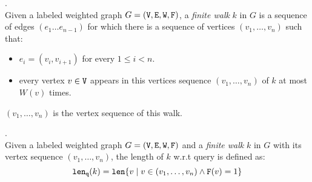 \documentclass[a4paper,11pt]{article}
\begin{document}
\begin{defn}.
\\
Given a labeled weighted graph $G = (\mathtt{V}, \mathtt{E}, \mathtt{W}, \mathtt{F})$, a \emph{finite walk} $k$ in $G$ is a sequence of edges $(e_1 \ldots e_{n - 1})$ 
for which there is a sequence of vertices $(v_1, \ldots, v_{n})$ such that:
\begin{itemize}
    \item $e_i = (v_{i},v_{i + 1})$ for every $1 \leq i < n$.
    \item every vertex $v \in \mathtt{V}$ appears in this vertices sequence $(v_1, \ldots, v_{n})$ of $k$ at most $W(v)$ times.  
\end{itemize}
$(v_1, \ldots, v_{n})$ is the vertex sequence of this walk.
\end{defn}

%
%
\begin{defn}.
\\
Given a labeled weighted graph $G = (\mathtt{V}, \mathtt{E}, \mathtt{W}, \mathtt{F})$ and a \emph{finite walk} $k$ in $G$ with its vertex sequence $(v_1, \ldots, v_{n})$, the length of $k$ w.r.t query is defined as:
\[
	\mathtt{len}_{\tt q}(k) = \mathtt{len}\{ v \mid v \in (v_1, \ldots, v_{n}) \land \mathtt{F}(v) = 1 \}
\]
\end{defn}
\end{document}
